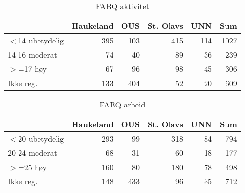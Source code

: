 \documentclass[norsk,a4paper]{article}\usepackage[]{graphicx}\usepackage[]{color}
\begin{document}
\begin{table}[ht]
\centering
\begin{tabular}{lrrrrr}
  \hline
 & Haukeland & OUS & St. Olavs & UNN & Sum \\ 
  \hline
$<$14 ubetydelig & 395 & 103 & 415 & 114 & 1027 \\ 
  14-16 moderat & 74 & 40 & 89 & 36 & 239 \\ 
  $>$=17 høy & 67 & 96 & 98 & 45 & 306 \\ 
   Ikke reg. & 133 & 404 & 52 & 20 & 609 \\ 
   \hline
\end{tabular}
\caption{FABQ aktivitet} 
\end{table}
\begin{table}[ht]
\centering
\begin{tabular}{lrrrrr}
  \hline
 & Haukeland & OUS & St. Olavs & UNN & Sum \\ 
  \hline
$<$20 ubetydelig & 293 & 99 & 318 & 84 & 794 \\ 
  20-24 moderat & 68 & 31 & 60 & 18 & 177 \\ 
  $>$=25 høy & 160 & 80 & 180 & 78 & 498 \\ 
  Ikke reg. & 148 & 433 & 96 & 35 & 712 \\ 
   \hline
\end{tabular}
\caption{FABQ arbeid} 
\end{table}
\end{document}
